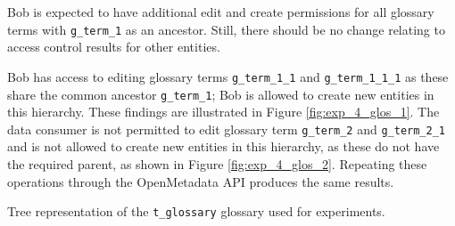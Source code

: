 Bob is expected to have additional edit and create permissions for all glossary terms with \texttt{g_term_1} as an ancestor. Still, there should be no change relating to access control results for other entities. 

Bob has access to editing glossary terms \texttt{g_term_1_1} and \texttt{g_term_1_1_1} as these share the common ancestor \texttt{g_term_1}; Bob is allowed to create new entities in this hierarchy. These findings are illustrated in Figure \ref{fig:exp_4_glos_1}. The data consumer is not permitted to edit glossary term \texttt{g_term_2} and \texttt{g_term_2_1} and is not allowed to create new entities in this hierarchy, as these do not have the required parent, as shown in Figure \ref{fig:exp_4_glos_2}. Repeating these operations through the OpenMetadata API produces the same results.

\begin{listing}

    \renewcommand\DTstyle{\rmfamily}
    
    \caption{Tree representation of the \texttt{t_glossary} glossary used for experiments.}
    
    \label{listing:exp_4_t_glossary}
    
\end{listing}